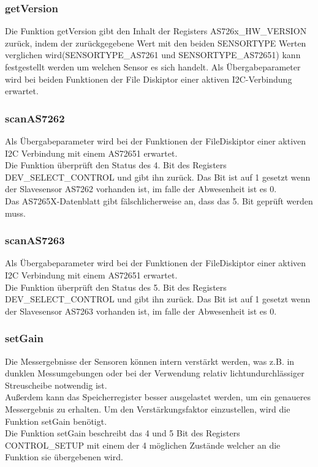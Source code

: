 

\subsubsection{getVersion}
Die Funktion getVersion gibt den Inhalt der Registers AS726x\_HW\_VERSION zurück, indem der zurückgegebene Wert mit den beiden SENSORTYPE Werten verglichen wird(SENSORTYPE\_AS7261 und SENSORTYPE\_AS72651) kann festgestellt werden um welchen Sensor es sich handelt. 
Als Übergabeparameter wird bei beiden Funktionen der File Diskiptor einer aktiven I2C-Verbindung erwartet.

\subsubsection{scanAS7262}
Als Übergabeparameter wird bei der Funktionen der FileDiskiptor einer aktiven I2C Verbindung mit einem AS72651 erwartet.\\
Die Funktion überprüft den Status des 4. Bit des Registers DEV\_SELECT\_CONTROL und gibt ihn zurück. Das Bit ist auf 1 gesetzt wenn der Slavesensor AS7262 vorhanden ist, im falle der Abwesenheit ist es 0.\\
Das AS7265X-Datenblatt gibt fälschlicherweise an, dass das 5. Bit geprüft werden muss.\\

\subsubsection{scanAS7263}
Als Übergabeparameter wird bei der Funktionen der FileDiskiptor einer aktiven I2C Verbindung mit einem AS72651 erwartet.\\
Die Funktion überprüft den Status des 5. Bit des Registers DEV\_SELECT\_CONTROL und gibt ihn zurück. Das Bit ist auf 1 gesetzt wenn der Slavesensor AS7263 vorhanden ist, im falle der Abwesenheit ist es 0.\\

\subsubsection{setGain}
Die Messergebnisse der Sensoren können intern verstärkt werden, was z.B. in dunklen Messumgebungen oder bei der Verwendung relativ lichtundurchlässiger Streuscheibe notwendig ist.\\
Außerdem kann das Speicherregister besser ausgelastet werden, um ein genaueres Messergebnis zu erhalten.
Um den Verstärkungsfaktor einzustellen, wird die Funktion setGain benötigt.\\
Die Funktion setGain beschreibt das 4 und 5 Bit des Registers CONTROL\_SETUP mit einem der 4 möglichen Zustände welcher an die Funktion sie übergebenen wird.

